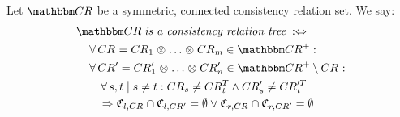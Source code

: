 \begin{definition} \label{def:relationtree}
    Let $\consistencyrelationset{CR}$ be a symmetric, connected consistency relation set. 
    We say:
    \begin{align*}
        &
        \consistencyrelationset{CR} \mathtextspacearound{is a consistency relation tree} \equivalentperdefinition \\
        & \formulaskip
        \forall \consistencyrelation{CR}{} = \consistencyrelation{CR}{1} \concat \dots \concat \consistencyrelation{CR}{m}  \in \transitiveclosure{\consistencyrelationset{CR}} : \\
        & \formulaskip
        \forall \consistencyrelation{CR}{}' = \consistencyrelation{CR}{1}' \concat \dots \concat \consistencyrelation{CR}{n}' \in \transitiveclosure{\consistencyrelationset{CR}} \setminus \consistencyrelation{CR}{} : \\
        & \formulaskip\formulaskip
        \forall s, t \mid s \neq t: 
        \consistencyrelation{CR}{s} \neq \consistencyrelation{CR}{t}^T \land \consistencyrelation{CR}{s}' \neq \consistencyrelation{CR}{t}'^T \\
        & \formulaskip\formulaskip
        \Rightarrow
        \classtuple{C}{l,\consistencyrelation{CR}{}} \cap
        \classtuple{C}{l,\consistencyrelation{CR}{}'} = \emptyset
        \lor \classtuple{C}{r,\consistencyrelation{CR}{}} \cap
        \classtuple{C}{r,\consistencyrelation{CR}{}'} = \emptyset

\end{align*}
\end{definition}
